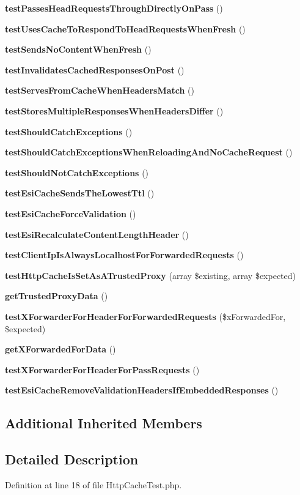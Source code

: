 \begin{DoxyCompactItemize}
{\bf test\+Passes\+Head\+Requests\+Through\+Directly\+On\+Pass} ()
\item 
{\bf test\+Uses\+Cache\+To\+Respond\+To\+Head\+Requests\+When\+Fresh} ()
\item 
{\bf test\+Sends\+No\+Content\+When\+Fresh} ()
\item 
{\bf test\+Invalidates\+Cached\+Responses\+On\+Post} ()
\item 
{\bf test\+Serves\+From\+Cache\+When\+Headers\+Match} ()
\item 
{\bf test\+Stores\+Multiple\+Responses\+When\+Headers\+Differ} ()
\item 
{\bf test\+Should\+Catch\+Exceptions} ()
\item 
{\bf test\+Should\+Catch\+Exceptions\+When\+Reloading\+And\+No\+Cache\+Request} ()
\item 
{\bf test\+Should\+Not\+Catch\+Exceptions} ()
\item 
{\bf test\+Esi\+Cache\+Sends\+The\+Lowest\+Ttl} ()
\item 
{\bf test\+Esi\+Cache\+Force\+Validation} ()
\item 
{\bf test\+Esi\+Recalculate\+Content\+Length\+Header} ()
\item 
{\bf test\+Client\+Ip\+Is\+Always\+Localhost\+For\+Forwarded\+Requests} ()
\item 
{\bf test\+Http\+Cache\+Is\+Set\+As\+A\+Trusted\+Proxy} (array \$existing, array \$expected)
\item 
{\bf get\+Trusted\+Proxy\+Data} ()
\item 
{\bf test\+X\+Forwarder\+For\+Header\+For\+Forwarded\+Requests} (\$x\+Forwarded\+For, \$expected)
\item 
{\bf get\+X\+Forwarded\+For\+Data} ()
\item 
{\bf test\+X\+Forwarder\+For\+Header\+For\+Pass\+Requests} ()
\item 
{\bf test\+Esi\+Cache\+Remove\+Validation\+Headers\+If\+Embedded\+Responses} ()
\end{DoxyCompactItemize}
\subsection*{Additional Inherited Members}


\subsection{Detailed Description}


Definition at line 18 of file Http\+Cache\+Test.\+php.



